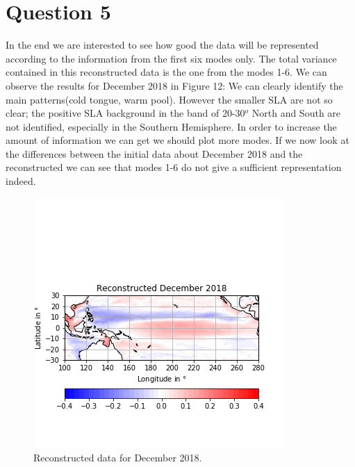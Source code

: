 \documentclass{article}
\begin{document}
\section*{Question 5}
In the end we are interested to see how good the data will be represented according to the information from the first six modes only. The total variance contained in this reconstructed data is the one from the modes 1-6. We can observe the results for December 2018 in Figure 12: We can clearly identify the main patterns(cold tongue, warm pool). However the smaller SLA are not so clear; the positive SLA background in the band of 20-30$^o$ North and South are not identified, especially in the Southern Hemisphere. In order to increase the amount of information we can get we should plot more modes. If we now look at the differences between the initial data about December 2018 and the reconstructed we can see that modes 1-6 do not give a sufficient representation indeed. 
\begin{figure}[b!]
\centering
\includegraphics[width=1.0\linewidth]{reconstructedDec.png}
\caption{Reconstructed data for December 2018.}
\label{fig:recDEC}
\end{figure}
\end{document}
